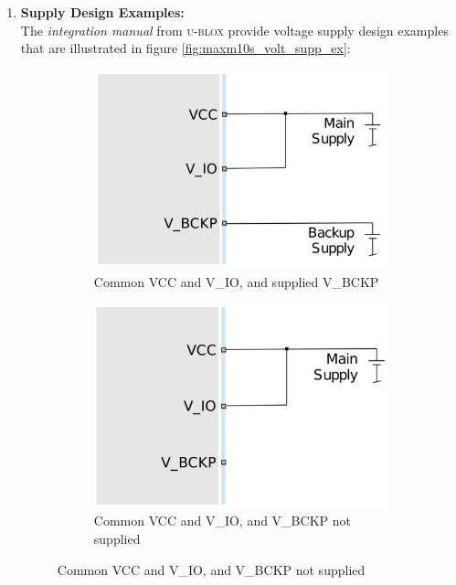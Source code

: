 \documentclass[report.tex]{subfiles}
\begin{document}
\begin{enumerate}
\item \textbf{Supply Design Examples:}\\
The \textit{integration manual} from \textsc{u-blox} provide voltage supply design examples that are illustrated in figure \ref{fig:maxm10s_volt_supp_ex}:

\begin{figure}[H]
\begin{subfigure}{0.45\textwidth}
\centering
	\includegraphics[width=1\textwidth]{Include/Figure/comp/maxm10s_volt_supp_ex1.png}
	\caption{\centering Common VCC and V\_IO, and supplied V\_BCKP}
\end{subfigure} \hfill
\begin{subfigure}{0.43\textwidth}
\centering
	\includegraphics[width=1\textwidth]{Include/Figure/comp/maxm10s_volt_supp_ex2.png}
	\caption{\centering Common VCC and V\_IO, and V\_BCKP not supplied}

\end{subfigure}
\end{figure}
\end{enumerate}
\end{document}
